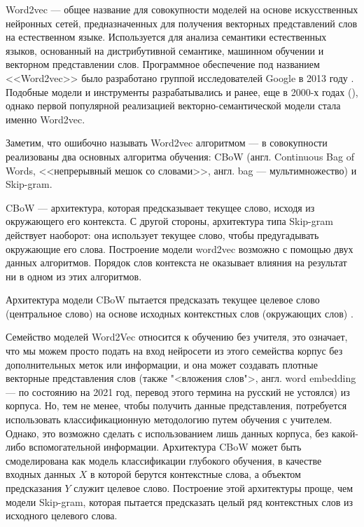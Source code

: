Word2vec --- общее название для совокупности моделей на основе искусственных нейронных сетей, предназначенных для получения
векторных представлений слов на естественном языке. Используется для анализа семантики естественных языков, основанный
на дистрибутивной семантике, машинном обучении и векторном представлении слов. Программное обеспечение под названием
<<Word2vec>> было разработано группой исследователей Google в 2013 году \cite{mikolov-etal-2013-linguistic,mikolov2013efficient}.
Подобные модели и инструменты разрабатывались и ранее, еще в 2000-х годах (\cite{bengio2003neural,collobert2008}),
однако первой популярной реализацией векторно-семантической модели стала именно Word2vec.

Заметим, что ошибочно называть Word2vec алгоритмом --- в совокупности реализованы два основных алгоритма обучения:
CBoW (англ. Continuous Bag of Words, <<непрерывный мешок со словами>>, англ. bag --- мультимножество)
и Skip-gram.

CBoW --- архитектура, которая предсказывает текущее слово, исходя из окружающего его контекста. С другой стороны, архитектура
типа Skip-gram действует наоборот: она использует текущее слово, чтобы предугадывать окружающие его слова.
Построение модели word2vec возможно с помощью двух данных алгоритмов.
Порядок слов контекста не оказывает влияния на результат ни в одном из этих алгоритмов.

Архитектура модели CBoW пытается предсказать текущее целевое слово (центральное слово) на основе исходных контекстных слов
(окружающих слов) \cite{kdnuggets2018cbow}.

Семейство моделей Word2Vec относится к обучению без учителя, это означает, что мы можем просто подать на вход нейросети из этого семейства
корпус без дополнительных меток или информации, и она может создавать плотные векторные представления слов (также "<вложения слов">,
англ. word embedding --- по состоянию на 2021 год, перевод этого термина на русский не устоялся) из корпуса.
Но, тем не менее, чтобы получить данные представления, потребуется использовать классификационную методологию путем обучения с учителем.
Однако, это возможно сделать с использованием лишь данных корпуса, без какой-либо вспомогательной информации.
Архитектура CBoW может быть смоделирована как модель классификации глубокого обучения, в качестве входных данных $X$ в которой берутся
контекстные слова, а объектом предсказания $Y$ служит целевое слово. Построение этой архитектуры проще, чем модели Skip-gram,
которая пытается предсказать целый ряд контекстных слов из исходного целевого слова.

